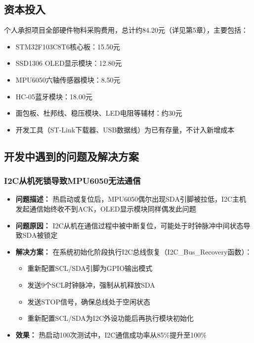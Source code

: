 \subsection{资本投入}
个人承担项目全部硬件物料采购费用，总计约84.20元（详见第5章），主要包括：
\begin{itemize}
    \item STM32F103C8T6核心板：15.50元
    \item SSD1306 OLED显示模块：12.80元
    \item MPU6050六轴传感器模块：8.50元
    \item HC-05蓝牙模块：18.00元
    \item 面包板、杜邦线、稳压模块、LED电阻等辅材：约30元
    \item 开发工具（ST-Link下载器、USB数据线）为已有存量，不计入新增成本
\end{itemize}

\subsection{开发中遇到的问题及解决方案}

\subsubsection{I2C从机死锁导致MPU6050无法通信}
\begin{itemize}
    \item \textbf{问题描述：} 热启动或复位后，MPU6050偶尔出现SDA引脚被拉低，I2C主机发起通信始终收不到ACK，OLED显示模块同样偶发此问题
    \item \textbf{问题原因：} I2C从机在通信过程中被中断复位，可能处于时钟脉冲中间状态导致SDA被锁定
    \item \textbf{解决方案：} 在系统初始化阶段执行I2C总线恢复（I2C\_Bus\_Recovery函数）：
    \begin{itemize}
        \item 重新配置SCL/SDA引脚为GPIO输出模式
        \item 发送9个SCL时钟脉冲，强制从机释放SDA
        \item 发送STOP信号，确保总线处于空闲状态
        \item 重新配置SCL/SDA为I2C外设功能后再执行模块初始化
    \end{itemize}
    \item \textbf{效果：} 热启动100次测试中，I2C通信成功率从85\%提升至100\%
\end{itemize}

